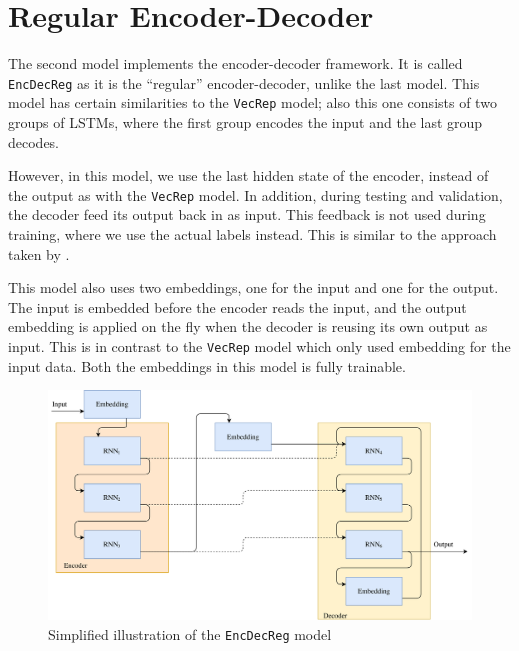 
\section{Regular Encoder-Decoder}
\label{sec:regular_encoder_decoder}
The second model implements the encoder-decoder framework. It is called {\tt EncDecReg} as it is the ``regular'' encoder-decoder, unlike the last model. This model has certain similarities to the {\tt VecRep} model; also this one consists of two groups of LSTMs, where the first group encodes the input and the last group decodes.

However, in this model, we use the last hidden state of the encoder, instead of the output as with the {\tt VecRep} model. In addition, during testing and validation, the decoder feed its output back in as input. This feedback is not used during training, where we use the actual labels instead. This is similar to the approach taken by \cite{bengio2015scheduled}.

This model also uses two embeddings, one for the input and one for the output. The input is embedded before the encoder reads the input, and the output embedding is applied on the fly when the decoder is reusing its own output as input. This is in contrast to the {\tt VecRep} model which only used embedding for the input data. Both the embeddings in this model is fully trainable.

\begin{figure}[!ht]
    \centering
    \includegraphics[width=1\textwidth]{fig/models/encdecreg_model.png}
    \caption{Simplified illustration of the {\tt EncDecReg} model}
    \label{fig:encdecreg_model}
\end{figure}

